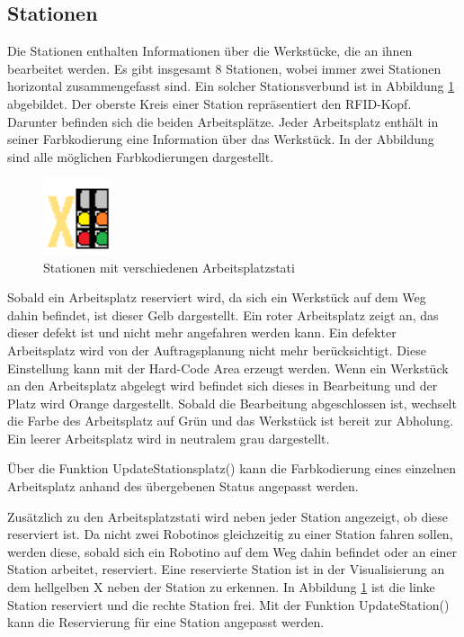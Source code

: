 \subsection{Stationen}

Die Stationen enthalten Informationen über die Werkstücke, die an ihnen bearbeitet werden. Es gibt insgesamt 8 Stationen, wobei immer zwei Stationen horizontal zusammengefasst sind. Ein solcher Stationsverbund ist in Abbildung \ref{fig:Station} abgebildet. Der oberste Kreis einer Station repräsentiert den RFID-Kopf. Darunter befinden sich die beiden Arbeitsplätze. Jeder Arbeitsplatz enthält in seiner Farbkodierung eine Information über das Werkstück. In der Abbildung sind alle möglichen Farbkodierungen dargestellt.

\begin{figure}[htb]
    \centering
    \includegraphics[width=0.18\textwidth]{Abbildungen/Station.png}
    \caption{Stationen mit verschiedenen Arbeitsplatzstati}		
    \label{fig:Station}
\end{figure}

Sobald ein Arbeitsplatz reserviert wird, da sich ein Werkstück auf dem Weg dahin befindet, ist dieser Gelb dargestellt. Ein roter Arbeitsplatz zeigt an, das dieser defekt ist und nicht mehr angefahren werden kann. Ein defekter Arbeitsplatz wird von der Auftragsplanung nicht mehr berücksichtigt. Diese Einstellung kann mit der Hard-Code Area erzeugt werden. Wenn ein Werkstück an den Arbeitsplatz abgelegt wird befindet sich dieses in Bearbeitung und der Platz wird Orange dargestellt. Sobald die Bearbeitung abgeschlossen ist, wechselt die Farbe des Arbeitsplatz auf Grün und das Werkstück ist bereit zur Abholung. Ein leerer Arbeitsplatz wird in neutralem grau dargestellt. 

Über die Funktion UpdateStationsplatz() kann die Farbkodierung eines einzelnen Arbeitsplatz anhand des übergebenen Status angepasst werden. 

Zusätzlich zu den Arbeitsplatzstati wird neben jeder Station angezeigt, ob diese reserviert ist. Da nicht zwei Robotinos gleichzeitig zu einer Station fahren sollen, werden diese, sobald sich ein Robotino auf dem Weg dahin befindet oder an einer Station arbeitet, reserviert. Eine reservierte Station ist in der Visualisierung an dem hellgelben X neben der Station zu erkennen. In Abbildung \ref{fig:Station} ist die linke Station reserviert und die rechte Station frei. Mit der Funktion UpdateStation() kann die Reservierung für eine Station angepasst werden. 

